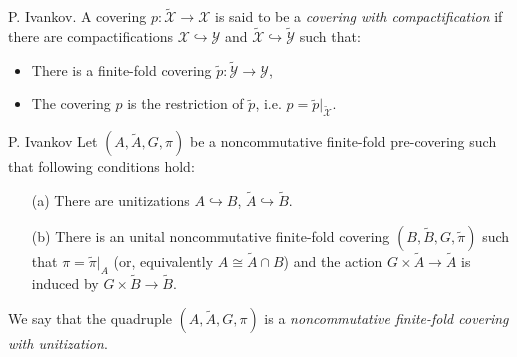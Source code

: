 \documentclass{beamer}
\theoremstyle{plain}
\newcommand{\hookto}{\hookrightarrow}        %
\begin{document}
\begin{frame}


\begin{definition}\label{top_cov_comp_defn}
	\alert{P. Ivankov}. 	A   covering $p: \widetilde{   \mathcal X } \to \mathcal X$ is said to be a \textit{ covering with compactification} if there are compactifications ${   \mathcal X } \hookto {   \mathcal Y }$ and $\widetilde{   \mathcal X } \hookto \widetilde{   \mathcal Y }$ such that:
	\begin{itemize}
		\item There is a finite-fold  covering $\widetilde{p}:\widetilde{   \mathcal Y }\to {   \mathcal Y }$,
		\item The covering $p$ is the restriction of $\widetilde{p}$, i.e. $p = \widetilde{p}|_{\widetilde{   \mathcal X }}$.
	\end{itemize}
\end{definition}
\begin{definition}\label{fin_comp_defn}\alert{P. Ivankov}
	Let $\left(A, \widetilde{A}, G, \pi \right)$ be a noncommutative finite-fold  pre-covering such  that following conditions hold:
	\begin{enumerate}
		\item[(a)] 
		There are unitizations $A \hookto B$, $\widetilde{A} \hookto \widetilde{B}$.
		\item[(b)] There is an %
		unital  noncommutative finite-fold covering	$\left(B ,\widetilde{B}, G, \widetilde{\pi} \right)$ such that $\pi = \widetilde{\pi}|_A$ (or, equivalently $A \cong \widetilde{A}\cap B$) and the action $G \times\widetilde{A} \to \widetilde{A}$ is induced by $G \times\widetilde{B} \to \widetilde{B}$.
	\end{enumerate}
	We say that the  quadruple $\left(A, \widetilde{A}, G, \pi \right)$ is a
	\textit{noncommutative finite-fold covering with unitization}. 
\end{definition}

\end{frame}
\end{document}
